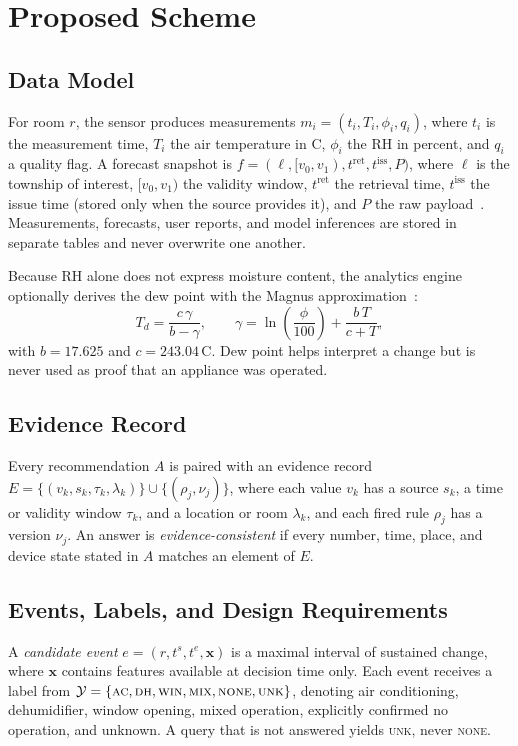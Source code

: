 \section{Proposed Scheme}\label{sec:method}
\subsection{Data Model}
For room $r$, the sensor produces measurements
$m_i=(t_i, T_i, \phi_i, q_i)$, where $t_i$ is the measurement time, $T_i$ the air temperature in \textdegree C, $\phi_i$ the RH in percent, and $q_i$ a quality flag. A forecast snapshot is
$f=(\ell, [v_0, v_1), t^{\mathrm{ret}}, t^{\mathrm{iss}}, P)$, where $\ell$ is the township of interest, $[v_0,v_1)$ the validity window, $t^{\mathrm{ret}}$ the retrieval time, $t^{\mathrm{iss}}$ the issue time (stored only when the source provides it), and $P$ the raw payload~\cite{cwa_township,cwa_api}. Measurements, forecasts, user reports, and model inferences are stored in separate tables and never overwrite one another.

Because RH alone does not express moisture content, the analytics engine optionally derives the dew point with the Magnus approximation~\cite{lawrence2005dewpoint}:
\begin{equation}
T_d=\frac{c\,\gamma}{b-\gamma},\qquad
\gamma=\ln\!\left(\frac{\phi}{100}\right)+\frac{b\,T}{c+T},
\label{eq:dewpoint}
\end{equation}
with $b=17.625$ and $c=243.04$\,\textdegree C. Dew point helps interpret a change but is never used as proof that an appliance was operated.

\subsection{Evidence Record}
Every recommendation $A$ is paired with an evidence record
$E=\{(v_k, s_k, \tau_k, \lambda_k)\}\cup\{(\rho_j, \nu_j)\}$,
where each value $v_k$ has a source $s_k$, a time or validity window $\tau_k$, and a location or room $\lambda_k$, and each fired rule $\rho_j$ has a version $\nu_j$. An answer is \emph{evidence-consistent} if every number, time, place, and device state stated in $A$ matches an element of $E$.

\subsection{Events, Labels, and Design Requirements}
A \emph{candidate event} $e=(r, t^{s}, t^{e}, \mathbf{x})$ is a maximal interval of sustained change, where $\mathbf{x}$ contains features available at decision time only. Each event receives a label from
$\mathcal{Y}=\{\textsc{ac}, \textsc{dh}, \textsc{win}, \textsc{mix}, \textsc{none}, \textsc{unk}\}$,
denoting air conditioning, dehumidifier, window opening, mixed operation, explicitly confirmed no operation, and unknown. A query that is not answered yields \textsc{unk}, never \textsc{none}.

